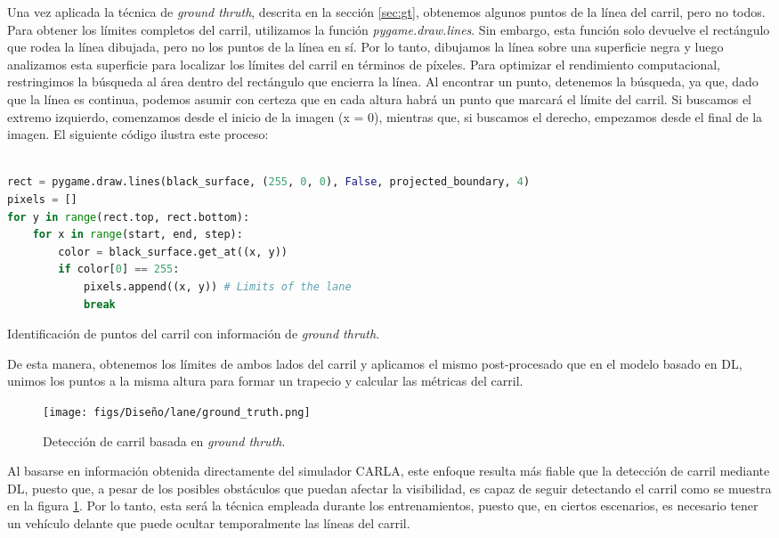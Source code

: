 Una vez aplicada la técnica de \textit{ground thruth}, descrita en la sección \ref{sec:gt}, obtenemos algunos puntos de la línea del carril, pero no todos. Para obtener los límites completos del carril, utilizamos la función \textit{pygame.draw.lines}. Sin embargo, esta función solo devuelve el rectángulo que rodea la línea dibujada, pero no los puntos de la línea en sí. Por lo tanto, dibujamos la línea sobre una superficie negra y luego analizamos esta superficie para localizar los límites del carril en términos de píxeles. Para optimizar el rendimiento computacional, restringimos la búsqueda al área dentro del rectángulo que encierra la línea. Al encontrar un punto, detenemos la búsqueda, ya que, dado que la línea es continua, podemos asumir con certeza que en cada altura habrá un punto que marcará el límite del carril. Si buscamos el extremo izquierdo, comenzamos desde el inicio de la imagen (x = 0), mientras que, si buscamos el derecho, empezamos desde el final de la imagen. El siguiente código ilustra este proceso:

\begin{code}[h]
\begin{lstlisting}[language=Python]

rect = pygame.draw.lines(black_surface, (255, 0, 0), False, projected_boundary, 4)
pixels = []
for y in range(rect.top, rect.bottom):
    for x in range(start, end, step):
        color = black_surface.get_at((x, y))
        if color[0] == 255:
            pixels.append((x, y)) # Limits of the lane
            break
\end{lstlisting}
\caption[Identificación de puntos del carril con información de \textit{ground thruth}]{Identificación de puntos del carril con información de \textit{ground thruth}.}
\label{cod:gt_carril}
\end{code}

\newpage

De esta manera, obtenemos los límites de ambos lados del carril y aplicamos el mismo post-procesado que en el modelo basado en \ac{DL}, unimos los puntos a la misma altura para formar un trapecio y calcular las métricas del carril. 

\begin{figure}[ht]
\centering
\texttt{[image: figs/Diseño/lane/ground\_truth.png]}
\caption{Detección de carril basada en \textit{ground thruth}.}
\label{fig:gt_final_carril}
\end{figure}

Al basarse en información obtenida directamente del simulador CARLA, este enfoque resulta más fiable que la detección de carril mediante \ac{DL}, puesto que, a pesar de los posibles obstáculos que puedan afectar la visibilidad, es capaz de seguir detectando el carril como se muestra en la figura \ref{fig:gt_final_carril}. Por lo tanto, esta será la técnica empleada durante los entrenamientos, puesto que, en ciertos escenarios, es necesario tener un vehículo delante que puede ocultar temporalmente las líneas del carril.


